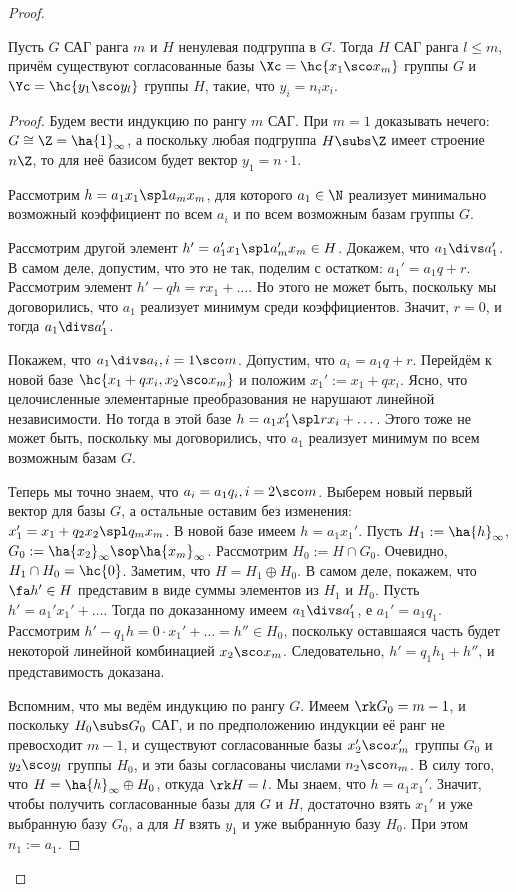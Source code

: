 \documentclass[a4paper]{article}
\begin{document}
\begin{proof}
\begin{theorem}
Пусть $G$ САГ ранга $m$ и $H$ ненулевая подгруппа в $G$. Тогда $H$ САГ  ранга $l \le m$, причём
существуют согласованные базы $\Xc = \hc{x_1\sco x_m}$ группы $G$ и $\Yc=\hc{y_1\sco y_l}$ группы $H$, такие,
что $y_i=n_ix_i$.
\end{theorem}
\begin{proof}
Будем вести индукцию по рангу $m$ САГ. При $m=1$ доказывать нечего:  $G \cong \Z = \ha{1}_\infty$, а
поскольку любая подгруппа $H \subs \Z$ имеет строение $n\Z$, то для неё базисом будет вектор $y_1=n\cdot 1$.

 Рассмотрим $h=a_1x_1 \spl a_mx_m$, для которого $a_1 \in \N$ реализует  минимально возможный
коэффициент по всем $a_i$ и по всем возможным базам группы $G$.

 Рассмотрим другой элемент $h'=a_1'x_1 \spl a_m'x_m \in H$. Докажем,  что $a_1 \divs a_1'$. В самом
деле, допустим, что это не так, поделим с остатком: $a_1'=a_1q+r$. Рассмотрим элемент $h'-qh=rx_1+\dots$. Но
этого не может быть, поскольку мы договорились, что $a_1$ реализует минимум среди коэффициентов. Значит,
$r=0$, и тогда $a_1 \divs a_1'$.

 Покажем, что $a_1 \divs a_i, i=1\sco m$. Допустим, что $a_i=a_1q+r$.  Перейдём к новой базе
$\hc{x_1+qx_i,x_2\sco x_m}$ и положим $x_1' := x_1+qx_i$. Ясно, что целочисленные элементарные преобразования
не нарушают линейной независимости. Но тогда в этой базе $h=a_1x_1' \spl rx_i+\dots$. Этого тоже не может
быть, поскольку мы договорились, что $a_1$ реализует минимум по всем возможным базам $G$.

 Теперь мы точно знаем, что $a_i=a_1q_i, i=2\sco m$. Выберем новый первый  вектор для базы $G$, а
остальные оставим без изменения: $x_1'=x_1+q_2x_2 \spl q_mx_m$. В новой базе имеем $h=a_1x_1'$. Пусть
$H_1:=\ha{h}_\infty$, $G_0:=\ha{x_2}_\infty\sop \ha{x_m}_\infty$. Рассмотрим $H_0:=H \cap G_0$. Очевидно,
$H_1 \cap H_0 = \hc{0}$. Заметим, что $H=H_1 \oplus H_0$. В самом деле, покажем, что $\fa h' \in H$
представим в виде суммы элементов из $H_1$ и $H_0$. Пусть $h'=a_1'x_1'+\dots$. Тогда по доказанному имеем
$a_1\divs a_1'$, е $a_1'=a_1q_1$. Рассмотрим $h'-q_1h=0\cdot x_1'+\dots=h'' \in H_0$, поскольку оставшаяся
часть будет некоторой линейной комбинацией $x_2\sco x_m$. Следовательно, $h'=q_1h_1+h''$, и представимость
доказана.

 Вспомним, что мы ведём индукцию по рангу $G$. Имеем $\rk G_0 = m-1$, и  поскольку $H_0 \subs G_0$
САГ, и по предположению индукции её ранг не превосходит $m-1$, и существуют согласованные базы $x_2'\sco
x_m'$ группы $G_0$ и $y_2\sco y_l$ группы $H_0$, и эти базы согласованы числами $n_2\sco n_m$. В силу того,
что $H=\ha{h}_\infty\oplus H_0$, откуда $\rk H = l$. Мы знаем, что $h=a_1x_1'$. Значит, чтобы получить
согласованные базы для $G$ и $H$, достаточно взять $x_1'$ и уже выбранную базу $G_0$, а для $H$ взять $y_1$ и
уже выбранную базу $H_0$. При этом $n_1 := a_1$.
\end{proof}


\end{proof}
\end{document}
